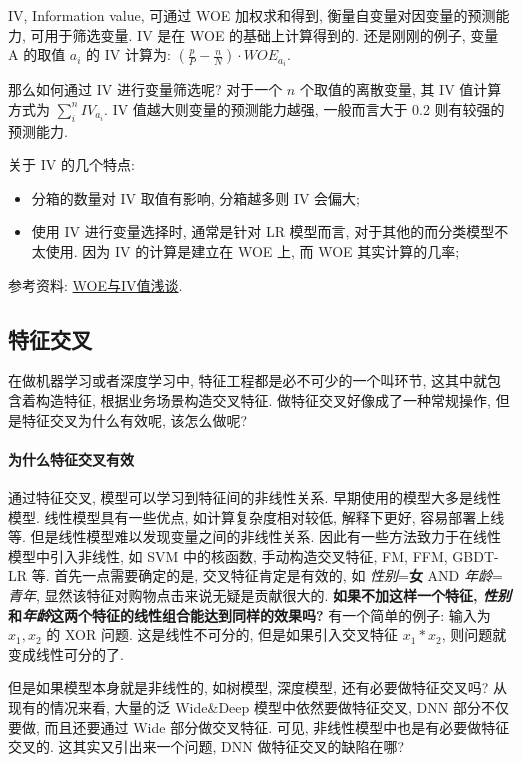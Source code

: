 IV, Information value, 可通过 WOE 加权求和得到, 衡量自变量对因变量的预测能力, 可用于筛选变量. IV 是在 WOE 的基础上计算得到的. 还是刚刚的例子, 变量 A 的取值 $a_i$ 的 IV 计算为: $(\frac{p}{P} - \frac{n}{N}) \cdot WOE_{a_i}$. 

那么如何通过 IV 进行变量筛选呢? 对于一个 $n$ 个取值的离散变量, 其 IV 值计算方式为 $\sum_i^n IV_{a_i}$. IV 值越大则变量的预测能力越强, 一般而言大于 0.2 则有较强的预测能力. 

关于 IV 的几个特点:
\begin{itemize}
	\item 分箱的数量对 IV 取值有影响, 分箱越多则 IV 会偏大;
	
	\item 使用 IV 进行变量选择时, 通常是针对 LR 模型而言, 对于其他的而分类模型不太使用. 因为 IV 的计算是建立在 WOE 上, 而 WOE 其实计算的几率;
\end{itemize}

参考资料: \href{https://zhuanlan.zhihu.com/p/74165987}{WOE与IV值浅谈}.

\subsection{特征交叉}
在做机器学习或者深度学习中, 特征工程都是必不可少的一个叫环节, 这其中就包含着构造特征, 根据业务场景构造交叉特征. 做特征交叉好像成了一种常规操作, 但是特征交叉为什么有效呢, 该怎么做呢?

\paragraph{为什么特征交叉有效}
通过特征交叉, 模型可以学习到特征间的非线性关系. 早期使用的模型大多是线性模型. 线性模型具有一些优点, 如计算复杂度相对较低, 解释下更好, 容易部署上线等. 但是线性模型难以发现变量之间的非线性关系. 因此有一些方法致力于在线性模型中引入非线性, 如 SVM 中的核函数, 手动构造交叉特征, FM, FFM, GBDT-LR 等. 首先一点需要确定的是, 交叉特征肯定是有效的, 如 \textit{性别}=\textbf{女} AND \textit{年龄}=\textit{青年}, 显然该特征对购物点击来说无疑是贡献很大的. \textbf{如果不加这样一个特征, \textit{性别}和\textit{年龄}这两个特征的线性组合能达到同样的效果吗?} 有一个简单的例子: 输入为 $x_1, x_2$ 的 XOR 问题. 这是线性不可分的, 但是如果引入交叉特征 $x_1*x_2$, 则问题就变成线性可分的了. 

但是如果模型本身就是非线性的, 如树模型, 深度模型, 还有必要做特征交叉吗? 从现有的情况来看, 大量的泛 Wide\&Deep 模型中依然要做特征交叉, DNN 部分不仅要做, 而且还要通过 Wide 部分做交叉特征. 可见, 非线性模型中也是有必要做特征交叉的. 这其实又引出来一个问题, DNN 做特征交叉的缺陷在哪?

